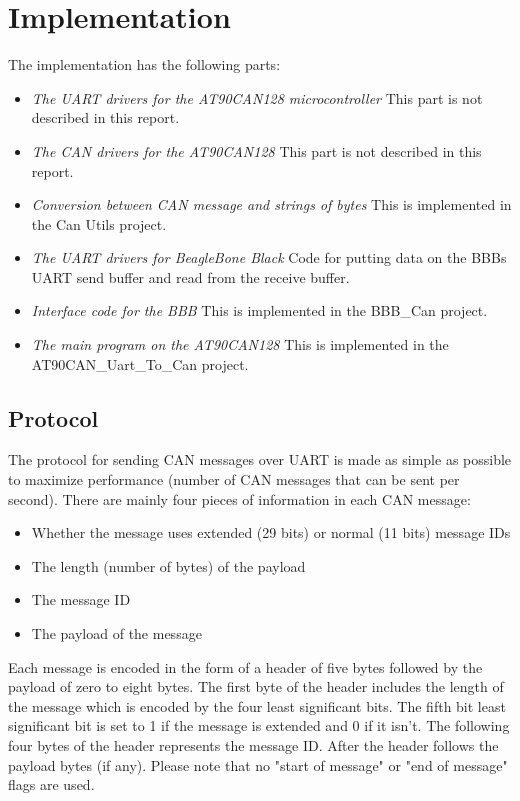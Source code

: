 
\section{Implementation}\label{sec:implementation}
The implementation has the following parts:

\begin{itemize}
   \item { \em The UART drivers for the AT90CAN128 microcontroller} \newline This part is not described in this report.
   \item { \em The CAN drivers for the AT90CAN128} \newline This part is not described in this report.
   \item { \em Conversion between CAN message and strings of bytes } \newline This is implemented in the Can Utils project.
   \item { \em The UART drivers for BeagleBone Black} \newline Code for putting data on the BBBs UART send buffer and read from the receive buffer.
   \item { \em Interface code for the BBB } \newline This is implemented in the BBB\_Can project.
   \item { \em The main program on the AT90CAN128} \newline This is implemented in the AT90CAN\_Uart\_To\_Can project.
\end{itemize}

\subsection{Protocol}
The protocol for sending CAN messages over UART is made as simple as possible to maximize performance (number of CAN messages that can be sent per second). There are mainly four pieces of information in each CAN message: 
\begin{itemize}
   \item { Whether the message uses extended (29 bits) or normal (11 bits) message IDs} 
   \item { The length (number of bytes) of the payload} 
   \item { The message ID}
   \item { The payload of the message}
\end{itemize}

Each message is encoded in the form of a header of five bytes followed by the payload of zero to eight bytes. The first byte of the header includes the length of the message which is encoded by the four least significant bits. The fifth bit least significant bit is set to 1 if the message is extended and 0 if it isn't. 
The following four bytes of the header represents the message ID. 
After the header follows the payload bytes (if any). \newline
Please note that no "start of message" or "end of message" flags are used.

